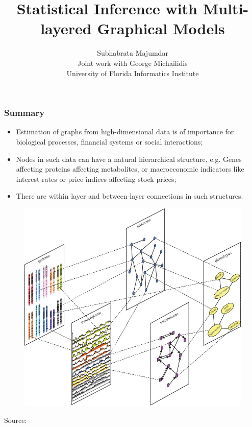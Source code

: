 \documentclass[10pt]{beamer}
\title[ Multi-layered Graphical Models]
{\Large  
Statistical Inference with Multi-layered Graphical Models}
\author[Majumdar and Michailidis]{Subhabrata Majumdar\\
{\footnotesize Joint work with George Michailidis\\
University of Florida Informatics Institute}}
\institute[]{AT\&T Labs - Research, Bedminster, NJ\\
April 5, 2018}
\date{}
\theoremstyle{definition}
\begin{document}

\frame{ \titlepage}


\begin{frame}
\frametitle{Summary}
\begin{itemize}
\item Estimation of graphs from high-dimensional data is of importance for biological processes, financial systems or social interactions;

\vspace{1em}
\item Nodes in such data can have a natural hierarchical structure, e.g. Genes affecting proteins affecting metabolites, or macroeconomic indicators like interest rates or price indices affecting stock prices;

\vspace{1em}
\item There are within layer and between-layer connections in such structures.
\end{itemize}
\end{frame}

\begin{frame}

\begin{figure}
\centering
\includegraphics[height=.9\textheight]{data_integration_schematic}
\end{figure}

{\center
{\scriptsize Source: {\colr \cite{GligPrzulj15}}}
}
\end{frame}
\end{document}
